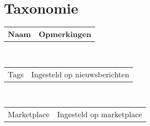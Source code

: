 \section{Taxonomie}\label{taxonomie}

\newcommand{\taxonomie}[2]{
  \begin{tabular}{ p{4cm} p{5cm} }
  #1 & #2
  \end{tabular}
  \\
}

\taxonomie{\textbf{Naam}}{\textbf{Opmerkingen}} 

\taxonomie{Tags}{Ingesteld op nieuwsberichten}
\taxonomie{Marketplace}{Ingesteld op marketplace}
